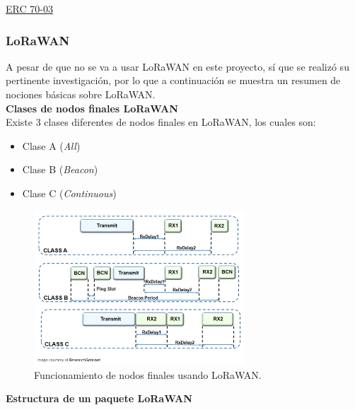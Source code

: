 \documentclass[12pt]{article}
\begin{document}
	\noindent \href{https://docdb.cept.org/download/25c41779-cd6e/Rec7003e.pdf}{ERC 70-03} \\
	
	
	\pagebreak
	
	\subsubsection[LoRaWAN]{LoRaWAN}
	
	\noindent A pesar de que no se va a usar LoRaWAN en este proyecto, sí que se realizó su pertinente investigación, por lo que a continuación se muestra un resumen de nociones básicas sobre LoRaWAN. \\
	
	\noindent \textbf{Clases de nodos finales LoRaWAN}  \\
	
	\noindent Existe 3 clases diferentes de nodos finales en LoRaWAN, los cuales son:
	
	\begin{itemize}
		\item Clase A (\textit{All})
		\item Clase B (\textit{Beacon})
		\item Clase C (\textit{Continuous})
	\end{itemize}
	
		\begin{figure}[h]
		\begin{center}
			\includegraphics[width=0.7\textwidth]{img/endDevices.png}
			\caption{Funcionamiento de nodos finales usando LoRaWAN.}
		\end{center}
	\end{figure}
	
	\pagebreak
	
	\noindent \textbf{Estructura de un paquete LoRaWAN}
	
\end{document}
